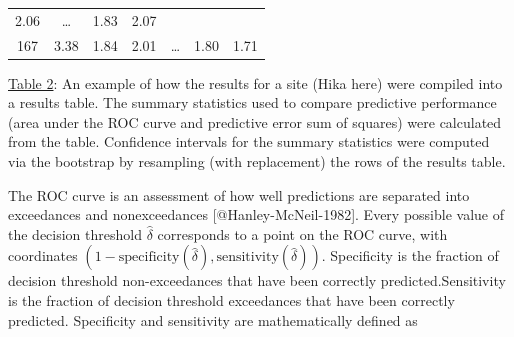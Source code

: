 \begin{longtable}[c]{@{}ccccccc@{}}
\begin{minipage}[t]{0.10\columnwidth}
2.06
\strut\end{minipage} &
\begin{minipage}[t]{0.09\columnwidth}\centering\strut
\dots
\strut\end{minipage} &
\begin{minipage}[t]{0.09\columnwidth}\centering\strut
1.83
\strut\end{minipage} &
\begin{minipage}[t]{0.10\columnwidth}\centering\strut
2.07
\strut\end{minipage}\tabularnewline
\begin{minipage}[t]{0.09\columnwidth}\centering\strut
167
\strut\end{minipage} &
\begin{minipage}[t]{0.17\columnwidth}\centering\strut
3.38
\strut\end{minipage} &
\begin{minipage}[t]{0.09\columnwidth}\centering\strut
1.84
\strut\end{minipage} &
\begin{minipage}[t]{0.10\columnwidth}\centering\strut
2.01
\strut\end{minipage} &
\begin{minipage}[t]{0.09\columnwidth}\centering\strut
\dots
\strut\end{minipage} &
\begin{minipage}[t]{0.09\columnwidth}\centering\strut
1.80
\strut\end{minipage} &
\begin{minipage}[t]{0.10\columnwidth}\centering\strut
1.71
\strut\end{minipage}\tabularnewline
\bottomrule
\end{longtable}

\hyperref[table:hika-results]{Table 2}: An example of how the results
for a site (Hika here) were compiled into a results table. The summary
statistics used to compare predictive performance (area under the ROC
curve and predictive error sum of squares) were calculated from the
table. Confidence intervals for the summary statistics were computed via
the bootstrap by resampling (with replacement) the rows of the results
table.

The ROC curve is an assessment of how well predictions are separated
into exceedances and nonexceedances {[}@Hanley-McNeil-1982{]}. Every
possible value of the decision threshold \(\hat{\delta}\) corresponds to
a point on the ROC curve, with coordinates
\((1-\text{specificity}(\hat{\delta}), \text{sensitivity}(\hat{\delta}))\).
Specificity is the fraction of decision threshold non-exceedances that
have been correctly predicted.Sensitivity is the fraction of decision
threshold exceedances that have been correctly predicted. Specificity
and sensitivity are mathematically defined as

